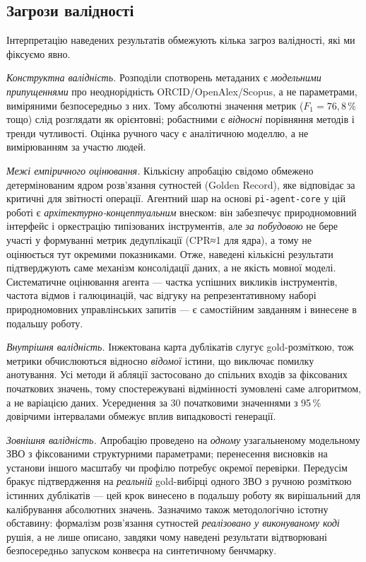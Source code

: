 \subsection*{Загрози валідності}

Інтерпретацію наведених результатів обмежують кілька загроз валідності, які ми фіксуємо явно.

\textit{Конструктна валідність.} Розподіли спотворень метаданих є \textit{модельними припущеннями} про неоднорідність ORCID/OpenAlex/Scopus, а не параметрами, виміряними безпосередньо з них. Тому абсолютні значення метрик ($F_1 = 76{,}8\,\%$ тощо) слід розглядати як орієнтовні; робастними є \textit{відносні} порівняння методів і тренди чутливості. Оцінка ручного часу є аналітичною моделлю, а не вимірюванням за участю людей.

\textit{Межі емпіричного оцінювання.} Кількісну апробацію свідомо обмежено детермінованим ядром розв'язання сутностей (Golden Record), яке відповідає за критичні для звітності операції. Агентний шар на основі \texttt{pi-agent-core} у цій роботі є \textit{архітектурно-концептуальним} внеском: він забезпечує природномовний інтерфейс і оркестрацію типізованих інструментів, але \textit{за побудовою} не бере участі у формуванні метрик дедуплікації (CPR≈1 для ядра), а тому не оцінюється тут окремими показниками. Отже, наведені кількісні результати підтверджують саме механізм консолідації даних, а не якість мовної моделі. Систематичне оцінювання агента --- частка успішних викликів інструментів, частота відмов і галюцинацій, час відгуку на репрезентативному наборі природномовних управлінських запитів --- є самостійним завданням і винесене в подальшу роботу.

\textit{Внутрішня валідність.} Інжектована карта дублікатів слугує gold-розміткою, тож метрики обчислюються відносно \textit{відомої} істини, що виключає помилку анотування. Усі методи й абляції застосовано до спільних входів за фіксованих початкових значень, тому спостережувані відмінності зумовлені саме алгоритмом, а не варіацією даних. Усереднення за 30 початковими значеннями з 95\,\% довірчими інтервалами обмежує вплив випадковості генерації.

\textit{Зовнішня валідність.} Апробацію проведено на \textit{одному} узагальненому модельному ЗВО з фіксованими структурними параметрами; перенесення висновків на установи іншого масштабу чи профілю потребує окремої перевірки. Передусім бракує підтвердження на \textit{реальній} gold-вибірці одного ЗВО з ручною розміткою істинних дублікатів --- цей крок винесено в подальшу роботу як вирішальний для калібрування абсолютних значень. Зазначимо також методологічно істотну обставину: формалізм розв'язання сутностей \textit{реалізовано у виконуваному коді} рушія, а не лише описано, завдяки чому наведені результати відтворювані безпосередньо запуском конвеєра на синтетичному бенчмарку.

